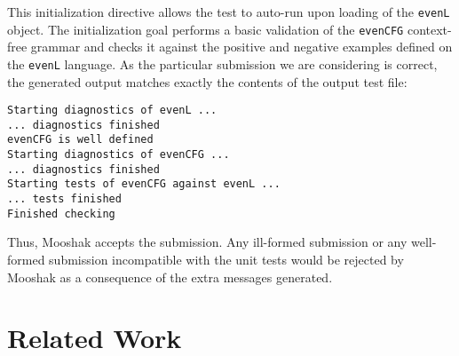 \documentclass{llncs}
\begin{document}
\noindent
This initialization directive allows the test to auto-run upon loading of the \lstinline{evenL} object. The initialization goal performs a basic validation of the \lstinline{evenCFG} context-free grammar and checks it against the positive and negative examples defined on the \lstinline{evenL} language. As the particular submission we are considering is correct, the generated output
matches exactly the contents of the output test file:

\begin{lstlisting}[caption={Output test file contents for checking the \lstinline{evenCFG} mechanism}, label=output]
Starting diagnostics of evenL ...
... diagnostics finished
evenCFG is well defined
Starting diagnostics of evenCFG ...
... diagnostics finished
Starting tests of evenCFG against evenL ...
... tests finished
Finished checking
\end{lstlisting}

\noindent
Thus, Mooshak accepts the submission. Any ill-formed submission or any well-formed submission incompatible with the unit tests would be rejected by Mooshak as a consequence of the extra messages generated.


\section{Related Work}
\end{document}
